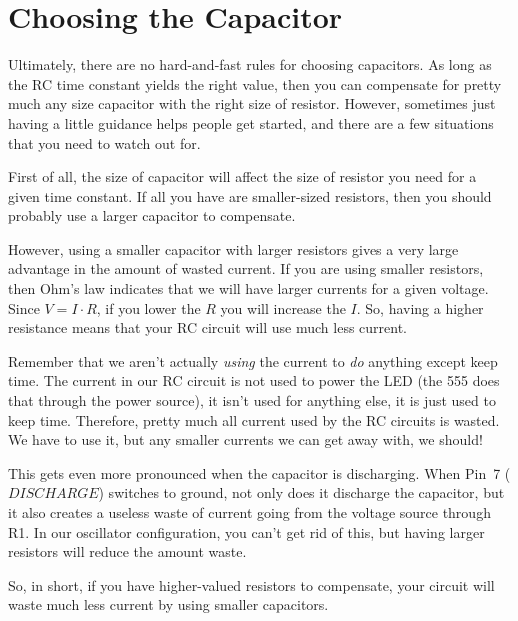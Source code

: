
\section{Choosing the Capacitor}

Ultimately, there are no hard-and-fast rules for choosing capacitors.  
As long as the RC time constant yields the right value, then you can compensate for pretty much any size capacitor with the right size of resistor.
However, sometimes just having a little guidance helps people get started, and there are a few situations that you need to watch out for.

First of all, the size of capacitor will affect the size of resistor you need for a given time constant.
If all you have are smaller-sized resistors, then you should probably use a larger capacitor to compensate.

However, using a smaller capacitor with larger resistors gives a very large advantage in the amount of wasted current.
If you are using smaller resistors, then Ohm's law indicates that we will have larger currents for a given voltage.  
Since $V = I\cdot R$, if you lower the $R$ you will increase the $I$.
So, having a higher resistance means that your RC circuit will use much less current.

Remember that we aren't actually \emph{using} the current to \emph{do} anything except keep time. 
The current in our RC circuit is not used to power the LED (the 555 does that through the power source), it isn't used for anything else, it is just used to keep time.
Therefore, pretty much all current used by the RC circuits is wasted.
We have to use it, but any smaller currents we can get away with, we should!

This gets even more pronounced when the capacitor is discharging.
When Pin~7 ($DISCHARGE$) switches to ground, not only does it discharge the capacitor, but it also creates a useless waste of current going from the voltage source through R1.
In our oscillator configuration, you can't get rid of this, but having larger resistors will reduce the amount waste.

So, in short, if you have higher-valued resistors to compensate, your circuit will waste much less current by using smaller capacitors.

\reviewsection

